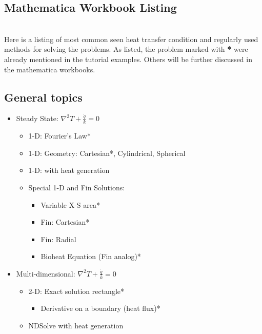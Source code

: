 \begin{appendices}
\appendixpage
\noappendicestocpagenum
\addappheadtotoc

\newcommand{\myWSEgPath}[1] {
\label{example:#1}
  \textcolor{blue} {(Please refer to .../workbooks/#1.nb)}}

\renewcommand{\thesection}{\arabic{section}}

\chapter*{Mathematica Workbook Listing}
~\\Here is a listing of most common seen heat transfer condition and regularly used methods for solving the problems. As listed, the problem marked with \textbf{*} were already mentioned in the tutorial examples. Others will be further discussed in the mathematica workbooks.

\section*{General topics}

\renewcommand{\labelitemiii}{$\circ$}

\begin{itemize}
\item Steady State: $\nabla^2T+\frac{\dot{q}}{k}=0$
\begin{itemize}
\item 1-D: Fourier's Law*
\item 1-D: Geometry: Cartesian*, Cylindrical, Spherical
\item 1-D: with heat generation
\item Special 1-D and Fin Solutions:
\begin{itemize}
\item Variable X-S area*
\item Fin: Cartesian*
\item Fin: Radial
\item Bioheat Equation (Fin analog)*
\end{itemize}
\end{itemize}

\item Multi-dimensional: $\nabla^2T+\frac{\dot{q}}{k}=0$
\begin{itemize}
\item 2-D: Exact solution rectangle*
\begin{itemize}
\item Derivative on a boundary (heat flux)*
\end{itemize}
\item NDSolve with heat generation
\end{itemize}


\end{itemize}
\end{appendices}
